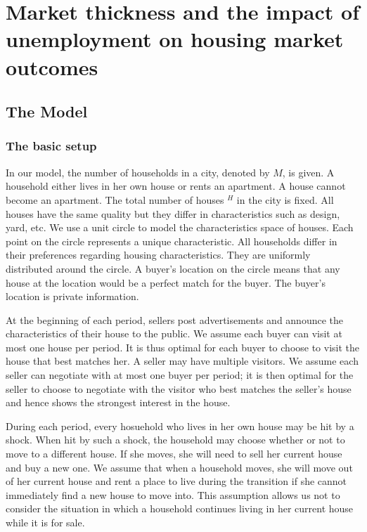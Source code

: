 \chapter{Market thickness and the impact of unemployment on housing market outcomes}

\section{The Model}

\subsection{The basic setup}

In our model, the number of households in a city, denoted by $M$, is given. A household either lives in her own house or rents an apartment. A house cannot become an apartment. The total number of houses $^H$ in the city is fixed. All houses have the same quality but they differ in characteristics such as design, yard, etc. We use a unit circle to model the characteristics space of houses. Each point on the circle represents a unique characteristic. All households differ in their preferences regarding housing characteristics. They are uniformly distributed around the circle. A buyer's location on the circle means that any house at the location would be a perfect match for the buyer. The buyer's location is private information.

At the beginning of each period, sellers post advertisements and announce the characteristics of their house to the public. We assume each buyer can visit at most one house per period. It is thus optimal for each buyer to choose to visit the house that best matches her. A seller may have multiple visitors. We assume each seller can negotiate with at most one buyer per period; it is then optimal for the seller to choose to negotiate with the visitor who best matches the seller's house and hence shows the strongest interest in the house.

During each period, every hosuehold who lives in her own house may be hit by a shock. When hit by such a shock, the household may choose whether or not to move to a different house. If she moves, she will need to sell her current house and buy a new one. We assume that when a household moves, she will move out of her current house and rent a place to live during the transition if she cannot immediately find a new house to move into. This assumption allows us not to consider the situation in which a household continues living in her current house while it is for sale.

